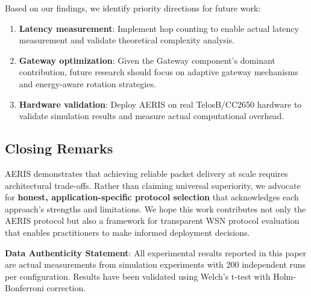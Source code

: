 Based on our findings, we identify priority directions for future work:

\begin{enumerate}
    \item \textbf{Latency measurement}: Implement hop counting to enable
    actual latency measurement and validate theoretical complexity analysis.

    \item \textbf{Gateway optimization}: Given the Gateway component's
    dominant contribution, future research should focus on adaptive
    gateway mechanisms and energy-aware rotation strategies.

    \item \textbf{Hardware validation}: Deploy AERIS on real TelosB/CC2650
    hardware to validate simulation results and measure actual
    computational overhead.
\end{enumerate}

\subsection{Closing Remarks}

AERIS demonstrates that achieving reliable packet delivery at scale requires
architectural trade-offs. Rather than claiming universal superiority,
we advocate for \textbf{honest, application-specific protocol selection}
that acknowledges each approach's strengths and limitations. We hope
this work contributes not only the AERIS protocol but also a framework
for transparent WSN protocol evaluation that enables practitioners to
make informed deployment decisions.

\textbf{Data Authenticity Statement}: All experimental results reported in
this paper are actual measurements from simulation experiments with 200
independent runs per configuration. Results have been validated using
Welch's t-test with Holm-Bonferroni correction.
